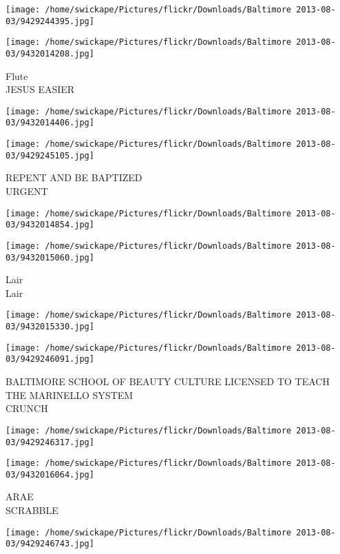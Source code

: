 \documentclass[10pt,letterpaper]{article}
\begin{document}
\texttt{[image: /home/swickape/Pictures/flickr/Downloads/Baltimore 2013-08-03/9429244395.jpg]}

\vspace{0.25in}
\texttt{[image: /home/swickape/Pictures/flickr/Downloads/Baltimore 2013-08-03/9432014208.jpg]}

Flute\\
JESUS EASIER
\pagebreak

\texttt{[image: /home/swickape/Pictures/flickr/Downloads/Baltimore 2013-08-03/9432014406.jpg]}

\vspace{0.25in}
\texttt{[image: /home/swickape/Pictures/flickr/Downloads/Baltimore 2013-08-03/9429245105.jpg]}

REPENT AND BE BAPTIZED\\
URGENT
\pagebreak

\texttt{[image: /home/swickape/Pictures/flickr/Downloads/Baltimore 2013-08-03/9432014854.jpg]}

\vspace{0.25in}
\texttt{[image: /home/swickape/Pictures/flickr/Downloads/Baltimore 2013-08-03/9432015060.jpg]}

Lair\\
Lair
\pagebreak

\texttt{[image: /home/swickape/Pictures/flickr/Downloads/Baltimore 2013-08-03/9432015330.jpg]}

\vspace{0.25in}
\texttt{[image: /home/swickape/Pictures/flickr/Downloads/Baltimore 2013-08-03/9429246091.jpg]}

BALTIMORE SCHOOL OF BEAUTY CULTURE LICENSED TO TEACH THE MARINELLO SYSTEM\\
CRUNCH
\pagebreak

\texttt{[image: /home/swickape/Pictures/flickr/Downloads/Baltimore 2013-08-03/9429246317.jpg]}

\vspace{0.25in}
\texttt{[image: /home/swickape/Pictures/flickr/Downloads/Baltimore 2013-08-03/9432016064.jpg]}

ARAE\\
SCRABBLE
\pagebreak

\texttt{[image: /home/swickape/Pictures/flickr/Downloads/Baltimore 2013-08-03/9429246743.jpg]}
\end{document}
